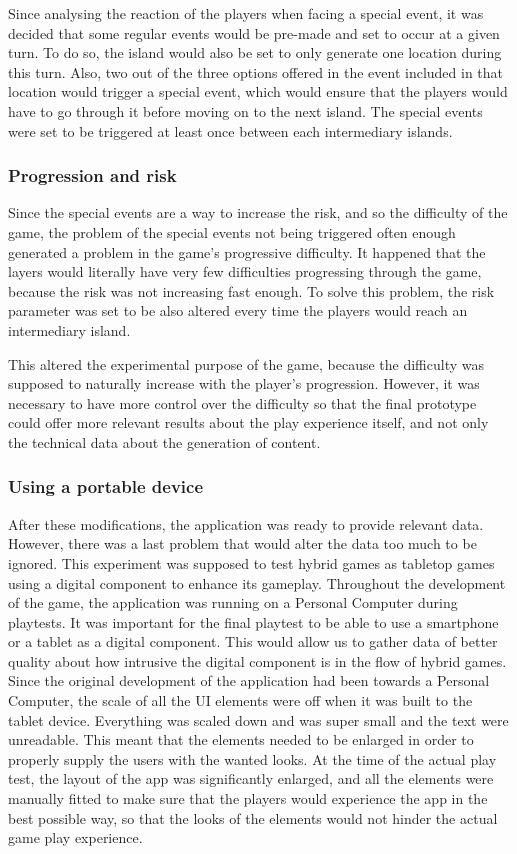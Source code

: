 Since analysing the reaction of the players when facing a special event, it was decided that some regular events would be pre-made and set to occur at a given turn. To do so, the island would also be set to only generate one location during this turn. Also, two out of the three options offered in the event included in that location would trigger a special event, which would ensure that the players would have to go through it before moving on to the next island. The special events were set to be triggered at least once between each intermediary islands.
\subsubsection{Progression and risk}
Since the special events are a way to increase the risk, and so the difficulty of the game, the problem of the special events not being triggered often enough generated a problem in the game's progressive difficulty. It happened that the layers would literally have very few difficulties progressing through the game, because the risk was not increasing fast enough. To solve this problem, the risk parameter was set to be also altered every time the players would reach an intermediary island.

This altered the experimental purpose of the game, because the difficulty was supposed to naturally increase with the player's progression. However, it was necessary to have more control over the difficulty so that the final prototype could offer more relevant results about the play experience itself, and not only the technical data about the generation of content.

\subsubsection{Using a portable device}
After these modifications, the application was ready to provide relevant data. However, there was a last problem that would alter the data too much to be ignored. This experiment was supposed to test hybrid games as tabletop games using a digital component to enhance its gameplay. Throughout the development of the game, the application was running on a Personal Computer during playtests. It was important for the final playtest to be able to use a smartphone or a tablet as a digital component. This would allow us to gather data of better quality about how intrusive the digital component is in the flow of hybrid games.  
Since the original development of the application had been towards a Personal Computer, the scale of all the UI elements were off when it was built to the tablet device. Everything was scaled down and was super small and the text were unreadable. This meant that the elements needed to be enlarged in order to properly supply the users with the wanted looks. At the time of the actual play test, the layout of the app was significantly enlarged, and all the elements were manually fitted to make sure that the players would experience the app in the best possible way, so that the looks of the elements would not hinder the actual game play experience.

